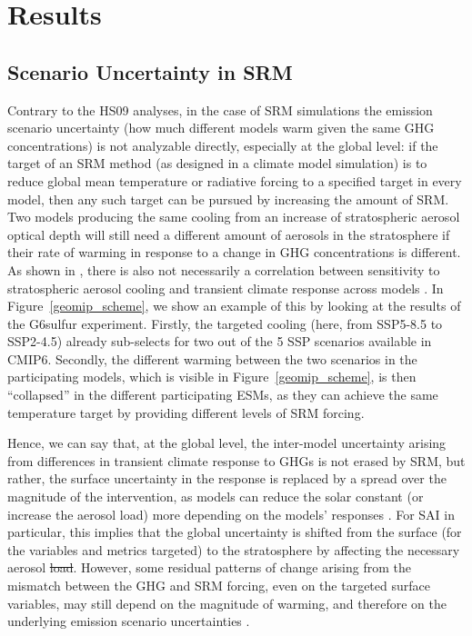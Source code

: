 \documentclass[draft]{agujournal2019}
\providecommand{\DIFadd}[1]{{\protect\color{blue}\uwave{#1}}} %
\providecommand{\DIFdel}[1]{{\protect\color{red}\sout{#1}}}                      %
\providecommand{\DIFaddbegin}{} %
\providecommand{\DIFaddend}{} %
\providecommand{\DIFdelbegin}{} %
\providecommand{\DIFdelend}{} %
\begin{document}
\section{Results}

\subsection{Scenario Uncertainty in SRM}

Contrary to the HS09 analyses, in the case of SRM simulations the emission scenario uncertainty (how much different models warm given the same GHG concentrations) is not analyzable directly, especially at the global level: if the target of an SRM method (as designed in a climate model simulation) is to reduce global mean temperature or radiative forcing to a specified target in every model, then any such target can be pursued by increasing the amount of SRM. Two models producing the same cooling from an increase of stratospheric aerosol optical depth will still need a different amount of aerosols in the stratosphere if their rate of warming in response to a change in GHG concentrations is different. As shown in , there is also not necessarily a correlation between sensitivity to stratospheric aerosol cooling and transient climate response across models \cite <similarly, independently verified in CMIP6 models for volcanic eruptions in>[]{Pauling2023}. In Figure~\ref{geomip_scheme}, we show an example of this by looking at the results of the G6sulfur experiment. Firstly, the targeted cooling (here, from SSP5-8.5 to SSP2-4.5) already sub-selects for two out of the 5 SSP scenarios available in CMIP6. Secondly, the different warming between the two scenarios in the participating models, which is visible in Figure~\ref{geomip_scheme}, is then ``collapsed'' in the different participating ESMs, as they can achieve the same temperature target by providing different levels of SRM forcing.

Hence, we can say that, at the global level, the inter-model uncertainty arising from differences in transient climate response to GHGs is not erased by SRM, but rather, the surface uncertainty in the response is replaced by a spread over the magnitude of the intervention, as models can reduce the solar constant (or increase the aerosol load) more depending on the models' responses \cite{MacMartin2018_paris}. For SAI in particular, this implies that the global uncertainty is shifted from the surface (for the variables and metrics targeted) to the stratosphere by affecting the necessary aerosol \DIFdelbegin \DIFdel{load}\DIFdelend \DIFaddbegin \DIFadd{optical depth and injection amounts}\DIFaddend . However, some residual patterns of change arising from the mismatch between the GHG and SRM forcing, even on the targeted surface variables, may still depend on the magnitude of warming, and therefore on the underlying emission scenario uncertainties \cite{Visioni2023,Zhang2024,henry2023comparison}.
\end{document}
